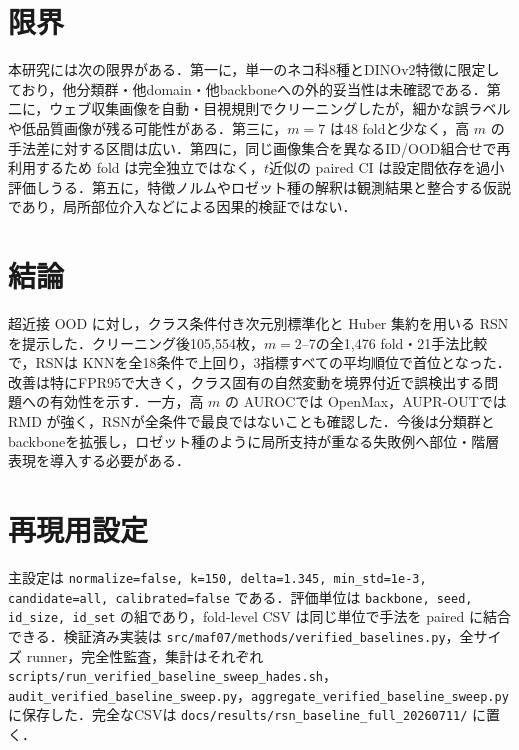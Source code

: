 \documentclass[uplatex,dvipdfmx,a4paper,10pt,twocolumn]{bxjsarticle}
\newcommand{\RSN}{RSN}
\newcommand{\knn}{KNN}
\begin{document}
\section{限界}

本研究には次の限界がある．第一に，単一のネコ科8種とDINOv2特徴に限定しており，他分類群・他domain・他backboneへの外的妥当性は未確認である．第二に，ウェブ収集画像を自動・目視規則でクリーニングしたが，細かな誤ラベルや低品質画像が残る可能性がある．第三に，$m=7$ は48 foldと少なく，高 $m$ の手法差に対する区間は広い．第四に，同じ画像集合を異なるID/OOD組合せで再利用するため fold は完全独立ではなく，$t$近似の paired CI は設定間依存を過小評価しうる．第五に，特徴ノルムやロゼット種の解釈は観測結果と整合する仮説であり，局所部位介入などによる因果的検証ではない．

\section{結論}

超近接 OOD に対し，クラス条件付き次元別標準化と Huber 集約を用いる \RSN を提示した．クリーニング後105,554枚，$m=2$--7の全1,476 fold・21手法比較で，\RSN は \knn を全18条件で上回り，3指標すべての平均順位で首位となった．改善は特にFPR95で大きく，クラス固有の自然変動を境界付近で誤検出する問題への有効性を示す．一方，高 $m$ の AUROCでは OpenMax，AUPR-OUTでは RMD が強く，\RSN が全条件で最良ではないことも確認した．今後は分類群とbackboneを拡張し，ロゼット種のように局所支持が重なる失敗例へ部位・階層表現を導入する必要がある．

\appendix
\section{再現用設定}

主設定は \texttt{normalize=false, k=150, delta=1.345, min\_std=1e-3, candidate=all, calibrated=false} である．評価単位は \texttt{backbone, seed, id\_size, id\_set} の組であり，fold-level CSV は同じ単位で手法を paired に結合できる．検証済み実装は \texttt{src/maf07/methods/verified\_baselines.py}，全サイズ runner，完全性監査，集計はそれぞれ \texttt{scripts/run\_verified\_baseline\_sweep\_hades.sh}，\texttt{audit\_verified\_baseline\_sweep.py}，\texttt{aggregate\_verified\_baseline\_sweep.py} に保存した．完全なCSVは \texttt{docs/results/rsn\_baseline\_full\_20260711/} に置く．
\end{document}
